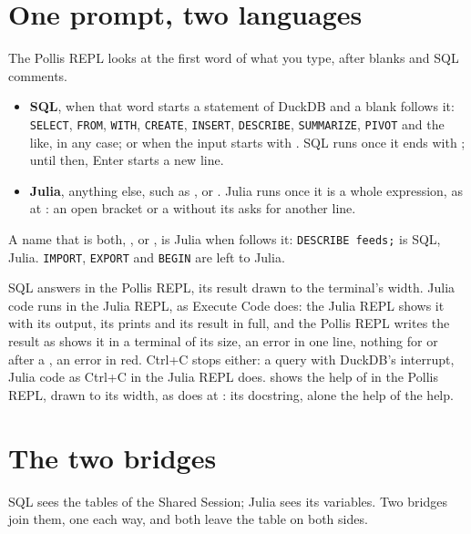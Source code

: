 \section{One prompt, two languages}\label{sec:routing}
The Pollis REPL looks at the first word of what you type, after blanks and SQL comments.
\begin{itemize}
  \item \textbf{SQL}, when that word starts a statement of DuckDB and a blank follows it: \texttt{\small SELECT},
    \texttt{\small FROM}, \texttt{\small WITH}, \texttt{\small CREATE}, \texttt{\small INSERT},
    \texttt{\small DESCRIBE}, \texttt{\small SUMMARIZE}, \texttt{\small PIVOT} and the like, in any case; or when the
    input starts with . SQL runs once it ends with \file{;}; until then, Enter starts a new line.
  \item \textbf{Julia}, anything else, such as ,  or . Julia runs
    once it is a whole expression, as at : an open bracket or a  without its 
    asks for another line.
\end{itemize}
A name that is both, ,  or , is Julia when \file{(} follows it:
\texttt{\small DESCRIBE feeds;} is SQL,  Julia. \texttt{\small IMPORT}, \texttt{\small EXPORT} and
\texttt{\small BEGIN} are left to Julia.

SQL answers in the Pollis REPL, its result drawn to the terminal's width. Julia code runs in the Julia REPL, as Execute
Code does: the Julia REPL shows it with its output, its prints and its result in full, and the Pollis REPL writes the
result as  shows it in a terminal of its size, an error in one line, nothing for  or after a \file{;}, an error in red. Ctrl+C stops either: a query with
DuckDB's interrupt, Julia code as Ctrl+C in the Julia REPL does.  shows the help of  in the
Pollis REPL, drawn to its width, as  does at :  its docstring,  alone the
help of the help.

\section{The two bridges}\label{sec:bridges}
SQL sees the tables of the Shared Session; Julia sees its variables. Two bridges join them, one each way, and both
leave the table on both sides.

